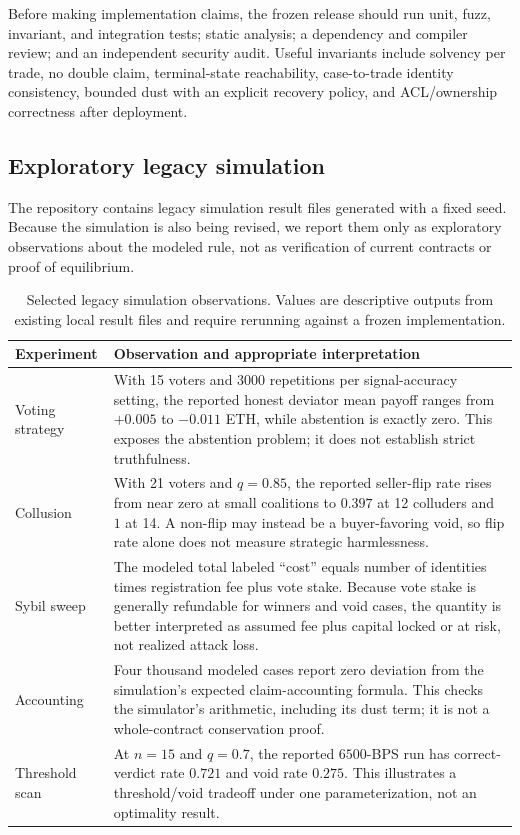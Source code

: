 Before making implementation claims, the frozen release should run unit, fuzz, invariant, and
integration tests; static analysis; a dependency and compiler review; and an independent security
audit. Useful invariants include solvency per trade, no double claim, terminal-state reachability,
case-to-trade identity consistency, bounded dust with an explicit recovery policy, and ACL/ownership
correctness after deployment.

\subsection{Exploratory legacy simulation}
\label{sec:eval}

The repository contains legacy simulation result files generated with a fixed seed. Because the
simulation is also being revised, we report them only as exploratory observations about the modeled
rule, not as verification of current contracts or proof of equilibrium.

\begin{table}[t]
\centering
\caption{Selected legacy simulation observations. Values are descriptive outputs from existing local
result files and require rerunning against a frozen implementation.}
\label{tab:legacy-results}
\small
\begin{tabular}{p{2.0cm}p{10.8cm}}
\toprule
Experiment & Observation and appropriate interpretation \\
\midrule
Voting strategy & With 15 voters and 3000 repetitions per signal-accuracy setting, the reported
honest deviator mean payoff ranges from $+0.005$ to $-0.011$ ETH, while abstention is exactly zero.
This exposes the abstention problem; it does not establish strict truthfulness. \\
Collusion & With 21 voters and $q=0.85$, the reported seller-flip rate rises from near zero at small
coalitions to $0.397$ at 12 colluders and $1$ at 14. A non-flip may instead be a buyer-favoring void,
so flip rate alone does not measure strategic harmlessness. \\
Sybil sweep & The modeled total labeled ``cost'' equals number of identities times registration fee
plus vote stake. Because vote stake is generally refundable for winners and void cases, the quantity
is better interpreted as assumed fee plus capital locked or at risk, not realized attack loss. \\
Accounting & Four thousand modeled cases report zero deviation from the simulation's expected
claim-accounting formula. This checks the simulator's arithmetic, including its dust term; it is not a
whole-contract conservation proof. \\
Threshold scan & At $n=15$ and $q=0.7$, the reported $6500$-BPS run has correct-verdict rate $0.721$
and void rate $0.275$. This illustrates a threshold/void tradeoff under one parameterization, not an
optimality result. \\
\bottomrule
\end{tabular}
\end{table}

